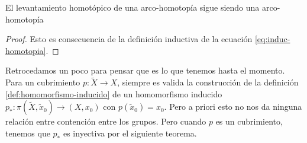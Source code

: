 \begin{corolario}\label{cor:preservar-arco-hom}
  El levantamiento homotópico de una arco-homotopía sigue siendo una arco-homotopía
\end{corolario}
\begin{proof}
  Esto es consecuencia de la definición inductiva de la ecuación
  \eqref{eq:induc-homotopia}.
\end{proof}

Retrocedamos un poco para pensar que es lo que tenemos hasta el momento.
Para un cubrimiento \(p : \tilde X \to X\), siempre es valida la
construcción de la definición \ref{def:homomorfismo-inducido} de un
homomorfismo inducido \(p_* : \pi \left( \tilde X , \tilde x _0 \right)
\to \left( X , x_0 \right)\) con \(p (\tilde x_0) = x_0\). Pero a priori
esto no nos da ninguna relación entre contención entre los grupos. Pero
cuando \(p\) es un cubrimiento, tenemos que \(p_*\) es inyectiva por el
siguiente teorema.

